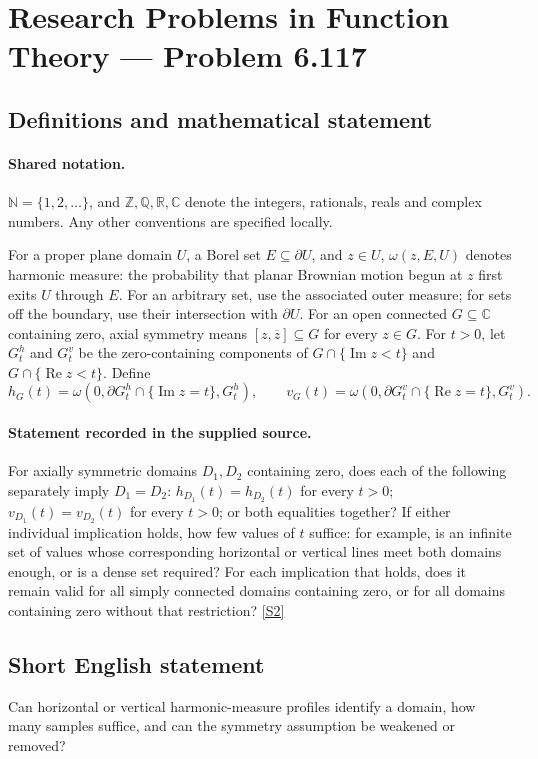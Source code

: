 \documentclass[11pt]{article}
\newcommand{\sref}[2]{\hyperlink{source:#1:#2}{[S#2]}}
\begin{document}
\section{Research Problems in Function Theory — Problem 6.117}\label{statement}

\subsection{Definitions and mathematical statement}

\paragraph{Shared notation.}$\mathbb N=\{1,2,\ldots\}$, and $\mathbb Z,\mathbb Q,\mathbb R,\mathbb C$ denote the integers, rationals, reals and complex numbers. Any other conventions are specified locally.


For a proper plane domain $U$, a Borel set $E\subseteq\partial U$, and $z\in U$, $\omega(z,E,U)$ denotes harmonic measure: the probability that planar Brownian motion begun at $z$ first exits $U$ through $E$. For an arbitrary set, use the associated outer measure; for sets off the boundary, use their intersection with $\partial U$.
For an open connected $G\subseteq\mathbb C$ containing zero, axial symmetry means $[z,\overline z]\subseteq G$ for every $z\in G$. For $t>0$, let $G_t^h$ and $G_t^v$ be the zero-containing components of $G\cap\{\operatorname{Im}z<t\}$ and $G\cap\{\operatorname{Re}z<t\}$. Define
\[h_G(t)=\omega(0,\partial G_t^h\cap\{\operatorname{Im}z=t\},G_t^h),\qquad
v_G(t)=\omega(0,\partial G_t^v\cap\{\operatorname{Re}z=t\},G_t^v).\]
\paragraph{Statement recorded in the supplied source.}
For axially symmetric domains $D_1,D_2$ containing zero, does each of the following separately imply $D_1=D_2$: $h_{D_1}(t)=h_{D_2}(t)$ for every $t>0$; $v_{D_1}(t)=v_{D_2}(t)$ for every $t>0$; or both equalities together? If either individual implication holds, how few values of $t$ suffice: for example, is an infinite set of values whose corresponding horizontal or vertical lines meet both domains enough, or is a dense set required? For each implication that holds, does it remain valid for all simply connected domains containing zero, or for all domains containing zero without that restriction? \sref{statement}{2}
\subsection{Short English statement}
Can horizontal or vertical harmonic-measure profiles identify a domain, how many samples suffice, and can the symmetry assumption be weakened or removed?
\end{document}
